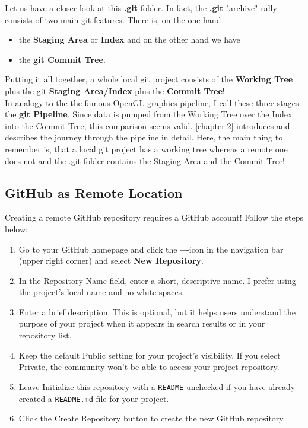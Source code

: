 Let us have a closer look at this \textbf{.git} folder. In fact, the \textbf{.git} "archive" rally consists of two main git features. There is, on the one hand 
\begin{itemize}
	\item the \textbf{Staging Area} or \textbf{Index} and on the other hand we have 
	\item the \textbf{git Commit Tree}.
\end{itemize}
Putting it all together, a whole local git project consists of the \textbf{Working Tree} plus the git \textbf{Staging Area/Index} plus the 
\textbf{Commit Tree}!
\\
In analogy to the the famous OpenGL graphics pipeline, I call these three stages the \textbf{git Pipeline}. Since data is pumped from the Working Tree over the Index
into the Commit Tree, this comparison seems valid. \cref{chapter:2} introduces and describes the journey through the pipeline in detail. Here, the main thing to remember is, 
that a local git project has a working tree whereas a remote one does not and the .git folder contains the Staging Area and the Commit Tree!


\subsection{GitHub as Remote Location}
\label{chapter:1.3.2}



Creating a remote GitHub repository requires a GitHub account! Follow the steps below:

\begin{enumerate}
	\item Go to your GitHub homepage and click the +-icon in the navigation bar (upper right corner) and select \textbf{New Repository}.
	\item In the Repository Name field, enter a short, descriptive name. I prefer using the project's local name and no white spaces.
	\item Enter a brief description. This is optional, but it helps users understand the purpose of your project when it appears in search 
	results or in your repository list.
	\item Keep the default Public setting for your project's visibility. If you select Private, the community won't be able to access your project repository.
	\item Leave Initialize this repository with a \verb|README| unchecked if you have already created a \verb|README.md| file for your project.
	\item Click the Create Repository button to create the new GitHub repository.
\end{enumerate}

